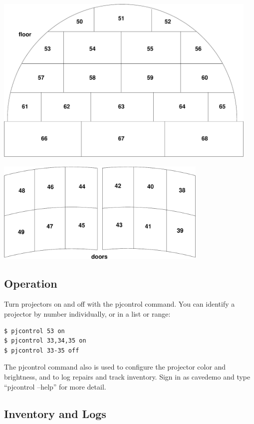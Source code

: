 \documentclass[11pt]{article}
\begin{document}
\begin{center}
\includegraphics[width=5in]{floor.pdf}
\end{center}

\begin{center}
\includegraphics[width=4in]{doors.pdf}
\end{center}

\subsection{Operation}
\label{projector-operation}

Turn projectors on and off with the pjcontrol command.  You can
identify a projector by number individually, or in a list or range: 

\begin{verbatim}
$ pjcontrol 53 on
$ pjcontrol 33,34,35 on
$ pjcontrol 33-35 off
\end{verbatim}

The pjcontrol command also is used to configure the projector color
and brightness, and to log repairs and track inventory.  Sign in as
cavedemo and type ``pjcontrol --help'' for more detail.


\subsection{Inventory and Logs}
\label{logging}
\end{document}
